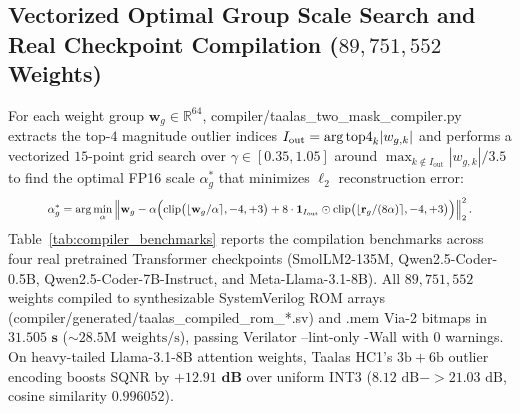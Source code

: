 \documentclass[10pt,journal,compsoc]{IEEEtran}
\def\texttt#1{#1}%
\def\to{->}%
\begin{document}
\subsection{Vectorized Optimal Group Scale Search and Real Checkpoint Compilation ($89,751,552$ Weights)}
For each weight group $\mathbf{w}_g \in \mathbb{R}^{64}$, \texttt{compiler/taalas\_two\_mask\_compiler.py} extracts the top-$4$ magnitude outlier indices $I_{\text{out}} = \text{arg\,top4}_{k}|w_{g,k}|$ and performs a vectorized $15$-point grid search over $\gamma \in [0.35, 1.05]$ around $\max_{k \notin I_{\text{out}}}|w_{g,k}|/3.5$ to find the optimal \texttt{FP16} scale $\alpha_g^*$ that minimizes $\ell_2$ reconstruction error:
\begin{equation}
\resizebox{0.88\columnwidth}{!}{$\displaystyle \alpha_g^* = \arg\min_{\alpha} \left\| \mathbf{w}_g - \alpha \Bigl( \text{clip}\bigl(\lfloor \mathbf{w}_g / \alpha \rceil, -4, +3\bigr) + 8 \cdot \mathbf{1}_{I_{\text{out}}} \odot \text{clip}\bigl(\lfloor \mathbf{r}_g / (8\alpha) \rceil, -4, +3\bigr) \Bigr) \right\|_2^2.$}
\label{eq:compiler_opt}
\end{equation}
Table~\ref{tab:compiler_benchmarks} reports the compilation benchmarks across four real pretrained Transformer checkpoints (\texttt{SmolLM2-135M}, \texttt{Qwen2.5-Coder-0.5B}, \texttt{Qwen2.5-Coder-7B-Instruct}, and \texttt{Meta-Llama-3.1-8B}). All $89,751,552$ weights compiled to synthesizable SystemVerilog ROM arrays (\texttt{compiler/generated/taalas\_compiled\_rom\_*.sv}) and \texttt{.mem} Via-2 bitmaps in $\mathbf{31.505\text{ s}}$ ($\sim 28.5\text{M weights/s}$), passing \texttt{Verilator --lint-only -Wall} with $0$ warnings. On heavy-tailed \texttt{Llama-3.1-8B} attention weights, Taalas HC1's $3\text{b}+6\text{b}$ outlier encoding boosts SQNR by $\mathbf{+12.91\text{ dB}}$ over uniform \texttt{INT3} ($8.12\text{ dB} \to 21.03\text{ dB}$, cosine similarity $0.996052$).
\end{document}
